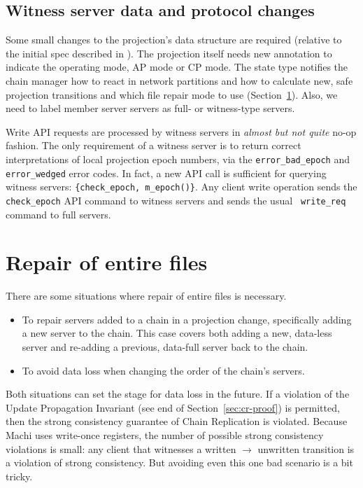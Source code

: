 \documentclass[preprint,10pt]{sigplanconf}
\begin{document}
\subsection{Witness server data and protocol changes}

Some small changes to the projection's data structure
are required (relative to the initial spec described in
\cite{machi-design}).  The projection itself
needs new annotation to indicate the operating mode, AP mode or CP
mode.  The state type notifies the chain manager how to
react in network partitions and how to calculate new, safe projection
transitions and which file repair mode to use
(Section~\ref{sec:repair-entire-files}).
Also, we need to label member server servers as full- or
witness-type servers.

Write API requests are processed by witness servers in {\em almost but
  not quite} no-op fashion.  The only requirement of a witness server
is to return correct interpretations of local projection epoch
numbers, via the {\tt error\_bad\_epoch} and {\tt error\_wedged} error
codes.  In fact, a new API call is sufficient for querying witness
servers: {\tt \{check\_epoch, m\_epoch()\}}.
Any client write operation sends the {\tt
  check\_\-epoch} API command to witness servers and sends the usual {\tt
  write\_\-req} command to full servers.

\section{Repair of entire files}
\label{sec:repair-entire-files}

There are some situations where repair of entire files is necessary.

\begin{itemize}
\item To repair servers added to a chain in a projection change,
  specifically adding a new server to the chain.  This case covers both
  adding a new, data-less server and re-adding a previous, data-full server
  back to the chain.
\item To avoid data loss when changing the order of the chain's servers.
\end{itemize}

Both situations can set the stage for data loss in the future.
If a violation of the Update Propagation Invariant (see end of
Section~\ref{sec:cr-proof}) is permitted, then the strong consistency
guarantee of Chain Replication is violated.  Because Machi uses
write-once registers, the number of possible strong consistency
violations is small: any client that witnesses a written $\rightarrow$
unwritten transition is a violation of strong consistency.  But
avoiding even this one bad scenario is a bit tricky.
\end{document}
